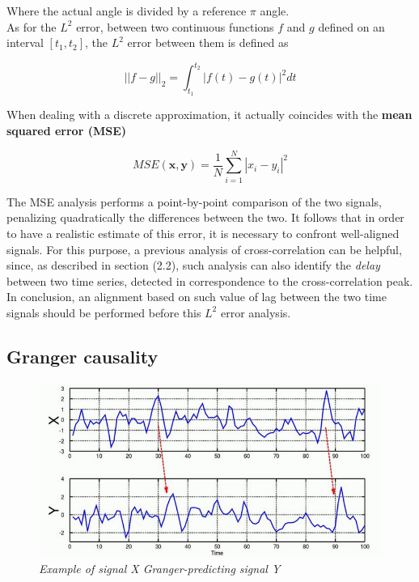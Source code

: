 \documentclass[a4paper]{article}
\begin{document}
Where the actual angle is divided by a reference $\pi$ angle.
\\
As for the $L^2$ error, between two continuous functions $f$ and $g$ defined on an interval $[t_1,t_2]$, the $L^2$ error between them is defined as 

$$ ||f-g||_2 = \int_{t_1}^{t_2}|f(t) - g(t)|^2 dt $$

When dealing with a discrete approximation, it actually coincides with the \textbf{mean squared error (MSE)}

$$ MSE(\textbf{x},\textbf{y}) = \frac{1}{N}\sum_{i=1}^{N}|x_i-y_i|^2 $$


The MSE analysis performs a point-by-point comparison of the two signals, penalizing quadratically the differences between the two. It follows that in order to have a realistic estimate of this error, it is necessary to confront well-aligned signals. For this purpose, a previous analysis of cross-correlation can be helpful, since, as described in section (2.2), such analysis can also identify the \textit{delay} between two time series, detected in correspondence to the cross-correlation peak. In conclusion, an alignment based on such value of lag between the two time signals should be performed before this $L^2$ error analysis.



\subsection{Granger causality}


\begin{figure}[H]
	\begin{center}
		\hspace*{-1cm}
		\includegraphics[scale=.60]{GC.png} 
	\end{center} 
	\caption{\textit{Example of signal X Granger-predicting signal Y }}
	
\end{figure}
\end{document}
